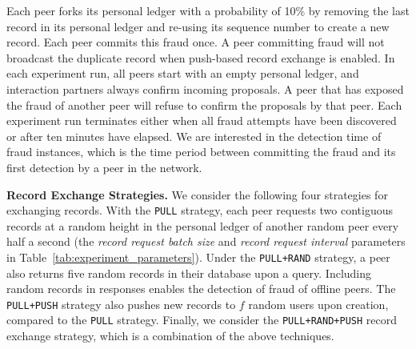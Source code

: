 Each peer forks its personal ledger with a probability of 10\% by removing the last record in its personal ledger and re-using its sequence number to create a new record.
Each peer commits this fraud once.
A peer committing fraud will not broadcast the duplicate record when push-based record exchange is enabled.
In each experiment run, all peers start with an empty personal ledger, and interaction partners always confirm incoming proposals.
A peer that has exposed the fraud of another peer will refuse to confirm the proposals by that peer.
Each experiment run terminates either when all fraud attempts have been discovered or after ten minutes have elapsed.
We are interested in the detection time of fraud instances, which is the time period between committing the fraud and its first detection by a peer in the network.

\textbf{Record Exchange Strategies.}
We consider the following four strategies for exchanging records.
With the \texttt{PULL} strategy, each peer requests two contiguous records at a random height in the personal ledger of another random peer every half a second (the \emph{record request batch size} and \emph{record request interval} parameters in Table~\ref{tab:experiment_parameters}).
Under the \texttt{PULL+RAND} strategy, a peer also returns five random records in their database upon a query.
Including random records in responses enables the detection of fraud of offline peers.
The \texttt{PULL+PUSH} strategy also pushes new records to $ f $ random users upon creation, compared to the \texttt{PULL} strategy.
Finally, we consider the \texttt{PULL+RAND+PUSH} record exchange strategy, which is a combination of the above techniques.

